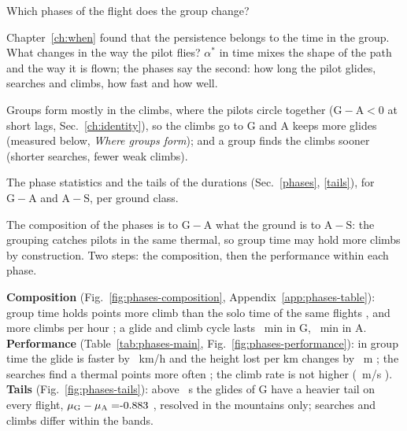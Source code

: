 \documentclass[10pt,a4paper]{article}
\newcommand{\G}{\mathrm{G}}
\newcommand{\A}{\mathrm{A}}
\newcommand{\Sl}{\mathrm{S}}
\newcommand{\Q}{\item[\textcolor{question}{\textbf{Q.}}]\color{question}}
\newcommand{\Res}{\item[\textcolor{answer}{\textbf{Result.}}]\color{black}}
\newcommand{\Hyp}{\item[\textcolor{question}{\textbf{Hypothesis.}}]\color{question}}
\newcommand{\Com}{\item[\textcolor{black}{\textbf{Comment.}}]\color{black}}
\newcommand{\Why}{\item[\textcolor{black}{\textbf{Why.}}]\color{black}}
\newcommand{\Tool}{\item[\textcolor{black}{\textbf{Tool.}}]\color{black}}
\newenvironment{step}{\begin{description}[leftmargin=0pt, itemsep=7pt, topsep=8pt]}{\end{description}}
\begin{document}
\begin{step}
\Q Which phases of the flight does the group change?
\Why Chapter~\ref{ch:when} found that the persistence belongs to the time in the group. What changes in the way
  the pilot flies? $\alpha^*$ in time mixes the shape of the path and the way it is flown; the phases say the
  second: how long the pilot glides, searches and climbs, how fast and how well.
\Hyp Groups form mostly in the climbs, where the pilots circle together ($\G-\A<0$ at short lags,
  Sec.~\ref{ch:identity}), so the climbs go to $\G$ and $\A$ keeps more glides (measured below, \emph{Where groups
  form}); and a group finds the climbs sooner (shorter searches, fewer weak climbs).
\Tool The phase statistics and the tails of the durations (Sec.~\ref{phases}, \ref{tails}), for $\G-\A$ and
  $\A-\Sl$, per ground class.
\Com The composition of the phases is to $\G-\A$ what the ground is to $\A-\Sl$: the grouping catches pilots in the
  same thermal, so group time may hold more climbs by construction. Two steps: the composition, then the
  performance within each phase.
\Res \textbf{Composition} (Fig.~\ref{fig:phases-composition}, Appendix~\ref{app:phases-table}): group time holds
  \PhShareClimbGAAll{} points more climb than the solo time of the same flights \PhShareClimbGAAllBand, and
  \PhCphGAAll{} more climbs per hour \PhCphGAAllBand; a glide and climb cycle lasts \PhCycleGAll~min in $\G$,
  \PhCycleAAll~min in $\A$.
  \textbf{Performance} (Table~\ref{tab:phases-main}, Fig.~\ref{fig:phases-performance}): in group time the glide is
  faster by \PhSpeedGAAll~km/h \PhSpeedGAAllBand{} and the height lost per km changes by \PhSinkGAAll~m
  \PhSinkGAAllBand; the searches find a thermal \PhFoundGAAll{} points more often \PhFoundGAAllBand; the climb rate
  is not higher (\PhRateGAAll~m/s \PhRateGAAllBand). \textbf{Tails} (Fig.~\ref{fig:phases-tails}): above
  \PhXminGlideAll~s the glides of $\G$ have a heavier tail on every flight, $\mu_\G-\mu_\A=\PhMuGlideGAAll$
  \PhMuGlideGAAllBand, resolved in the mountains only; searches and climbs differ within the bands.


\end{step}
\end{document}
